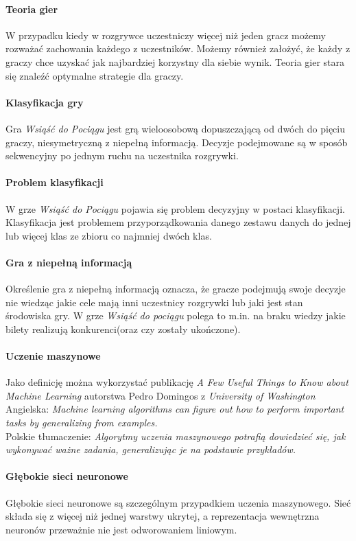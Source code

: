 \documentclass[12pt, oneside]{report}
\begin{document}
	\paragraph{Teoria gier} W przypadku kiedy w rozgrywce uczestniczy więcej niż jeden gracz możemy rozważać zachowania każdego z uczestników. Możemy również założyć, że każdy z graczy chce uzyskać jak najbardziej korzystny dla siebie wynik. Teoria gier stara się znaleźć optymalne strategie dla graczy.
	\paragraph{Klasyfikacja gry}
	Gra \textit{Wsiąść do Pociągu} jest grą wieloosobową dopuszczającą od dwóch do pięciu graczy, niesymetryczną z niepełną informacją. Decyzje podejmowane są w sposób sekwencyjny po jednym ruchu na uczestnika rozgrywki.
	\paragraph{Problem klasyfikacji}
	W grze \textit{Wsiąść do Pociągu} pojawia się problem decyzyjny w postaci klasyfikacji. Klasyfikacja jest problemem przyporządkowania danego zestawu danych do jednej lub więcej klas ze zbioru co najmniej dwóch klas.
	\paragraph{Gra z niepełną informacją} 
	Określenie gra z niepełną informacją oznacza, że gracze podejmują swoje decyzje nie wiedząc jakie cele mają inni uczestnicy rozgrywki lub jaki jest stan środowiska gry. W grze \textit{Wsiąść do pociągu} polega to m.in. na braku wiedzy jakie bilety realizują konkurenci(oraz czy zostały ukończone).
	\paragraph{Uczenie maszynowe} Jako definicję można wykorzystać publikację \textit{A Few Useful Things to Know about Machine Learning} autorstwa Pedro Domingos z \textit{University of Washington} \\
	Angielska:  \textit{Machine learning algorithms can figure out how to perform important tasks by generalizing from examples.} \\
	Polskie tłumaczenie: \textit{Algorytmy uczenia maszynowego potrafią dowiedzieć się, jak wykonywać ważne zadania, generalizując je na podstawie przykładów.}
	\paragraph{Głębokie sieci neuronowe}
	Głębokie sieci neuronowe są szczególnym przypadkiem uczenia maszynowego. Sieć składa się z więcej niż jednej warstwy ukrytej, a reprezentacja wewnętrzna neuronów przeważnie nie jest odworowaniem liniowym.
\end{document}
